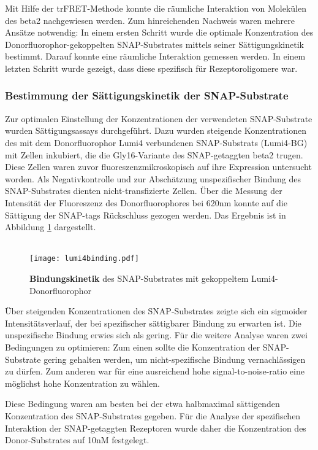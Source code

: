 Mit Hilfe der trFRET-Methode konnte die räumliche Interaktion von Molekülen des \gls{beta2} nachgewiesen werden. Zum hinreichenden Nachweis waren mehrere Ansätze notwendig: In einem ersten Schritt wurde die optimale Konzentration des Donorfluorophor-gekoppelten SNAP-Substrates mittels seiner Sättigungskinetik bestimmt. Darauf konnte eine räumliche Interaktion gemessen werden. In einem letzten Schritt wurde gezeigt, dass diese spezifisch für Rezeptoroligomere war.

\subsubsection{Bestimmung der Sättigungskinetik der SNAP-Substrate}
Zur optimalen Einstellung der Konzentrationen der verwendeten SNAP-Substrate wurden Sättigungsassays durchgeführt. Dazu wurden steigende Konzentrationen des mit dem Donorfluorophor Lumi4 verbundenen SNAP-Substrats (Lumi4-BG) mit Zellen inkubiert, die die Gly16-Variante des SNAP-getaggten \gls{beta2} trugen. Diese Zellen waren zuvor fluoreszenzmikroskopisch auf ihre Expression untersucht worden. Als Negativkontrolle und zur Abschätzung unspezifischer Bindung des SNAP-Substrates dienten nicht-transfizierte Zellen. Über die Messung der Intensität der Fluoreszenz des Donorfluorophores bei 620nm konnte auf die Sättigung der SNAP-tags Rückschluss gezogen werden. Das Ergebnis ist in Abbildung \ref{fig:lumi4binding} dargestellt.
\\ \\
\begin{figure}[H]
	\centering
    \texttt{[image: lumi4binding.pdf]}
    \caption{\textbf{Bindungskinetik} des SNAP-Substrates mit gekoppeltem Lumi4-Donorfluorophor}
    \label{fig:lumi4binding}
\end{figure}
Über steigenden Konzentrationen des SNAP-Substrates zeigte sich ein sigmoider Intensitätsverlauf, der bei spezifischer sättigbarer Bindung zu erwarten ist. Die unspezifische Bindung erwies sich als gering. Für die weitere Analyse waren zwei Bedingungen zu optimieren: Zum einen sollte die Konzentration der SNAP-Substrate gering gehalten werden, um nicht-spezifische Bindung vernachlässigen zu dürfen. Zum anderen war für eine ausreichend hohe signal-to-noise-ratio eine möglichst hohe Konzentration zu wählen.

Diese Bedingung waren am besten bei der etwa halbmaximal sättigenden Konzentration des SNAP-Substrates gegeben. Für die Analyse der spezifischen Interaktion der SNAP-getaggten Rezeptoren wurde daher die Konzentration des Donor-Substrates auf 10\si{\nano M} festgelegt.

